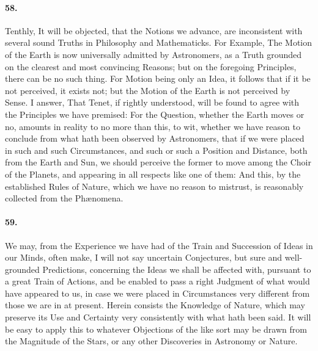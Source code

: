 \documentclass[]{article}
\newenvironment{sectionbody}{}{}
\begin{document}
\begin{sectionbody}
\paragraph{58.} Tenthly, It will be objected, that the Notions we advance, are
inconsistent with several sound Truths in Philosophy and
Mathematicks.  For Example, The Motion of the Earth is now
universally admitted by Astronomers, as a Truth grounded on the
clearest and most convincing Reasons;  but on the foregoing
Principles, there can be no such thing.  For Motion being only an
Idea, it follows that if it be not perceived, it exists not; but
the Motion of the Earth is not perceived by Sense.  I answer,
That Tenet, if rightly understood, will be found to agree with
the Principles we have premised: For the Question, whether the
Earth moves or no, amounts in reality to no more than this, to
wit, whether we have reason to conclude from what hath been
observed by Astronomers, that if we were placed in such and such
Circumstances, and such or such a Position and Distance, both
from the Earth and Sun, we should perceive the former to move
among the Choir of the Planets, and appearing in all respects
like one of them: And this, by the established Rules of Nature,
which we have no reason to mistrust, is reasonably collected from
the Ph{\ae}nomena.



\paragraph{59.} We may, from the Experience we have had of the Train and
Succession of Ideas in our Minds, often make, I will not say
uncertain Conjectures, but sure and well-grounded Predictions,
concerning the Ideas we shall be affected with, pursuant to a
great Train of Actions, and be enabled to pass a right Judgment
of what would have appeared to us, in case we were placed in
Circumstances very different from those we are in at present.
Herein consists the Knowledge of Nature, which may preserve its
Use and Certainty very consistently with what hath been said.  It
will be easy to apply this to whatever Objections of the like
sort may be drawn from the Magnitude of the Stars, or any other
Discoveries in Astronomy or Nature.




\end{sectionbody}
\end{document}
